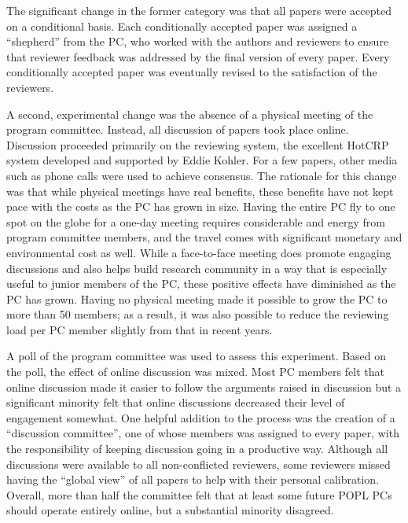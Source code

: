 The significant change in the former category was that all papers were
accepted on a conditional basis. Each conditionally accepted paper
was assigned a ``shepherd'' from the PC, who worked with the authors
and reviewers to ensure that reviewer feedback was addressed by the
final version of every paper. Every conditionally accepted paper was
eventually revised to the satisfaction of the reviewers.

A second, experimental change was the absence of a physical meeting of
the program committee. Instead, all discussion of papers took place
online. Discussion proceeded primarily on the reviewing system,
the excellent HotCRP system developed and supported by Eddie Kohler.
For a few papers, other media such as phone calls were used to achieve
consensus. The
rationale for this change was that while physical meetings have real
benefits, these benefits have not kept pace with the costs as the PC
has grown in size.  Having the entire PC fly to one spot on the globe
for a one-day meeting requires considerable and energy from program
committee members, and the travel comes with significant monetary and
environmental cost as well. While a face-to-face meeting does promote
engaging discussions and also helps build research community in a way
that is especially useful to junior members of the PC, these positive
effects have diminished as the PC has grown. Having no physical
meeting made it possible to grow the PC to more than 50 members; as
a result, it was also possible to reduce the reviewing load per PC
member slightly from that in recent years.

A poll of the program committee was used to assess this experiment.
Based on the poll, the effect of online discussion was mixed. Most
PC members felt that online discussion made it easier to follow the
arguments raised in discussion but a significant minority felt that
online discussions decreased their level of engagement somewhat. One
helpful addition to the process was the creation of a ``discussion
committee'', one of whose members was assigned to every paper, with
the responsibility of keeping discussion going in a productive
way. Although all discussions were available to all non-conflicted
reviewers, some reviewers missed having the ``global view'' of all
papers to help with their personal calibration. Overall, more than half the
committee felt that at least some future POPL PCs should operate
entirely online, but a substantial minority disagreed.

